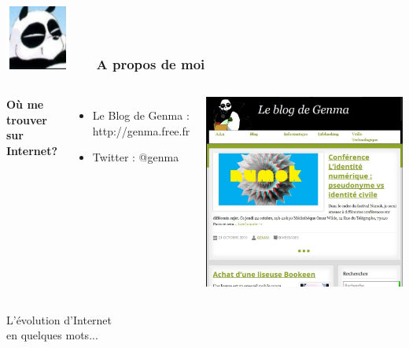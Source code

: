 \documentclass{beamer}
\begin{document}
\begin{frame}
\frametitle{\includegraphics[scale=0.4]{./images/Genma.jpg} \ \ \  A propos de moi  }
\begin{columns}[c] 
\textbf{Où me trouver sur Internet?}
\begin{itemize}
\item Le Blog de Genma : http://genma.free.fr
\item Twitter : @genma
\end{itemize}
\includegraphics[scale=0.40] {./images/blog.png} 
\end{columns}
\end{frame}


\begin{frame}
\begin{center}
\Huge{L'évolution d'Internet\\en quelques mots...}
\end{center}
\end{frame}
\end{document}
